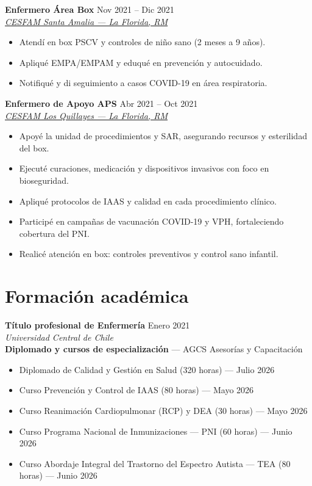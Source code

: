 \documentclass[11pt,a4paper]{article}
\newcommand{\cventry}[3]{%
  \textbf{#1} \hfill #2\\
  \textit{#3}\\[2pt]
}
\newcommand{\maps}[2]{%
  \href{https://www.google.com/maps/search/?api=1\&query=#1}{#2}%
}
\begin{document}
\cventry{Enfermero Área Box}
{Nov 2021 -- Dic 2021}
{\maps{CESFAM+Santa+Amalia+202,+La+Florida,+Santiago}{CESFAM Santa Amalia — La Florida, RM}}
\begin{itemize}
  \item Atendí en box PSCV y controles de niño sano (2 meses a 9 años).
  \item Apliqué EMPA/EMPAM y eduqué en prevención y autocuidado.
  \item Notifiqué y di seguimiento a casos COVID-19 en área respiratoria.
\end{itemize}
\vspace{6pt}

\cventry{Enfermero de Apoyo APS}
{Abr 2021 -- Oct 2021}
{\maps{CESFAM+Los+Quillayes+Julio+Cesar+10905,+La+Florida,+Santiago}{CESFAM Los Quillayes — La Florida, RM}}
\begin{itemize}
  \item Apoyé la unidad de procedimientos y SAR, asegurando recursos y esterilidad del box.
  \item Ejecuté curaciones, medicación y dispositivos invasivos con foco en bioseguridad.
  \item Apliqué protocolos de IAAS y calidad en cada procedimiento clínico.
  \item Participé en campañas de vacunación COVID-19 y VPH, fortaleciendo cobertura del PNI.
  \item Realicé atención en box: controles preventivos y control sano infantil.
\end{itemize}

\section{Formación académica}

\cventry{Título profesional de Enfermería}
{Enero 2021}
{Universidad Central de Chile}

\vspace{4pt}
\textbf{Diplomado y cursos de especialización} — AGCS Asesorías y Capacitación\\[2pt]
\begin{itemize}
  \item Diplomado de Calidad y Gestión en Salud (320 horas) — Julio 2026
  \item Curso Prevención y Control de IAAS (80 horas) — Mayo 2026
  \item Curso Reanimación Cardiopulmonar (RCP) y DEA (30 horas) — Mayo 2026
  \item Curso Programa Nacional de Inmunizaciones — PNI (60 horas) — Junio 2026
  \item Curso Abordaje Integral del Trastorno del Espectro Autista — TEA (80 horas) — Junio 2026
\end{itemize}
\end{document}
